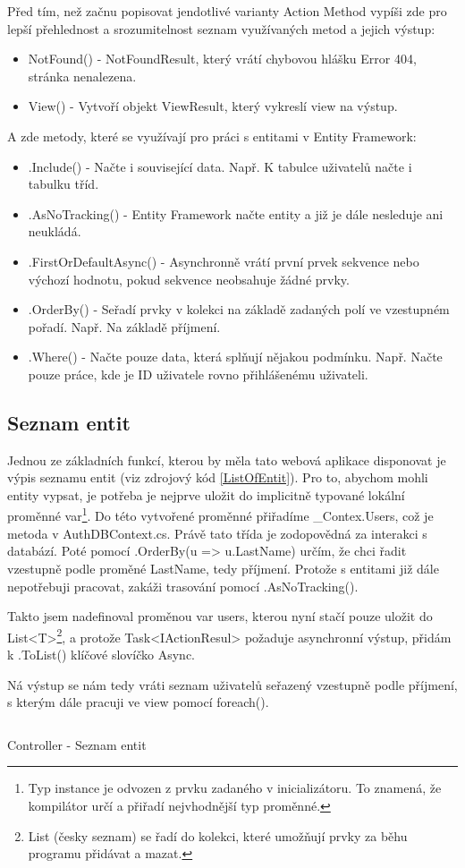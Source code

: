 \documentclass[a4paper, 12pt]{report}
\begin{document}
	Před tím, než začnu popisovat jendotlivé varianty Action Method vypíši zde pro lepší přehlednost a srozumitelnost seznam využívaných metod a jejich výstup:
	\begin{itemize}
		\item NotFound() - NotFoundResult, který vrátí chybovou hlášku Error 404, stránka nenalezena.
		\item View() - Vytvoří objekt ViewResult, který vykreslí view na výstup.
	\end{itemize}
	A zde metody, které se využívají pro práci s entitami v Entity Framework:
	\begin{itemize}
		\item .Include() - Načte i související data. Např. K tabulce uživatelů načte i tabulku tříd.
		\item .AsNoTracking() - Entity Framework načte entity a již je dále nesleduje ani neukládá.
		\item .FirstOrDefaultAsync() - Asynchronně vrátí první prvek sekvence nebo výchozí hodnotu, pokud sekvence neobsahuje žádné prvky.
		\item .OrderBy() - Seřadí prvky v kolekci na základě zadaných polí ve vzestupném pořadí. Např. Na základě příjmení.
		\item .Where() - Načte pouze data, která splňují nějakou podmínku. Např. Načte pouze práce, kde je ID uživatele rovno přihlášenému uživateli.
	\end{itemize}
	\subsection{Seznam entit}
	Jednou ze základních funkcí, kterou by měla tato webová aplikace disponovat je výpis seznamu entit (viz zdrojový kód \ref{ListOfEntit}). Pro to, abychom mohli entity vypsat, je potřeba je nejprve uložit do implicitně typované lokální proměnné var\footnote{Typ instance je odvozen z prvku zadaného v inicializátoru. To znamená, že kompilátor určí a přiřadí nejvhodnější typ proměnné.}. Do této vytvořené proměnné přiřadíme \_Contex.Users, což je metoda v AuthDBContext.cs. Právě tato třída je zodopovědná za interakci s databází. Poté pomocí .OrderBy(u => u.LastName) určím, že chci řadit vzestupně podle proměné LastName, tedy příjmení. Protože s entitami již dále nepotřebuji pracovat, zakáži trasování pomocí .AsNoTracking().\par
	Takto jsem nadefinoval proměnou var users, kterou nyní stačí pouze uložit do List<T>\footnote{List (česky seznam) se řadí do kolekci, které umožňují prvky za běhu programu přidávat a mazat.}, a protože Task<IActionResul> požaduje asynchronní výstup, přidám k .ToList() klíčové slovíčko Async.\par
	Ná výstup se nám tedy vráti seznam uživatelů seřazený vzestupně podle příjmení, s kterým dále pracuji ve view pomocí foreach().
	\begin{listing}[H]
		\inputminted{csharp}{SourceCode/Controllers/ListOfEntit.cs}
		\caption{Controller - Seznam entit}
		\label{ListOfEntit}
	\end{listing}
\end{document}
